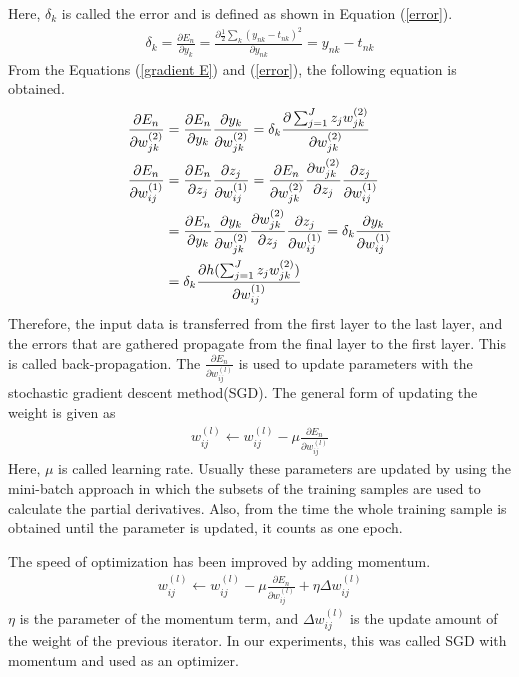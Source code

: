\documentclass[a4paper,12pt]{article}
\begin{document}
Here, $\delta_k$ is called the error and is defined as shown in Equation (\ref{error}).
\begin{align}
\delta_k=\frac{\partial E_n}{\partial y_k}=\frac{\partial \frac{1}{2}\sum_k{(y_{nk}-t_{nk})}^2}{\partial y_{nk}}=y_{nk}-t_{nk}
\end{align}
From the Equations (\ref{gradient E}) and (\ref{error}), the following equation is obtained.
\begin{align} \label{gradient f1}
\frac{\partial E_n}{\partial w^{(2)}_{jk}}
&=\frac{\partial E_n}{\partial y_k}\frac{\partial y_k}{\partial w^{(2)}_{jk}}
=\delta_k \frac{\partial \sum_{j=1}^J{z_j w^{(2)}_{jk}}}{\partial w^{(2)}_{jk}} \\ \notag
\frac{\partial E_n}{\partial w^{(1)}_{ij}}
&=\frac{\partial E_n}{\partial z_j} \frac{\partial z_j}{\partial w^{(1)}_{ij}}
=\frac{\partial E_n}{\partial w^{(2)}_{jk}} \frac{\partial w^{(2)}_{jk}}{\partial z_j} \frac{\partial z_j}{\partial w^{(1)}_{ij}} \\ \notag
&=\frac{\partial E_n}{\partial y_k}\frac{\partial y_k}{\partial w^{(2)}_{jk}} \frac{\partial w^{(2)}_{jk}}{\partial z_j} \frac{\partial z_j}{\partial w^{(1)}_{ij}}
=\delta_k\frac{\partial y_k}{\partial w^{(1)}_{ij}} \\ \label{gradient f2}
&=\delta_k \frac{\partial h(\sum_{j=1}^J{z_j w^{(2)}_{jk}})}{\partial w^{(1)}_{ij}}
\end{align}
Therefore, the input data is transferred from the first layer to the last layer, and the errors that are gathered propagate from the final layer to the first layer. This is called back-propagation.
The $\frac{\partial E_n}{\partial w^{(l)}_{ij}}$ is used to update parameters with the stochastic gradient descent method(SGD). The general form of updating the weight is given as
\begin{align} \label{eq:sgd}
w^{(l)}_{ij} \leftarrow w^{(l)}_{ij}-\mu \frac{\partial E_n}{\partial w^{(l)}_{ij}}
\end{align}
Here, $\mu$ is called learning rate. Usually these parameters are updated by using the mini-batch approach in which the subsets of the training samples are used to calculate the partial derivatives. Also, from the time the whole training sample is obtained until the parameter is updated, it counts as one epoch.

The speed of optimization has been improved by adding momentum.
\begin{align} \label{eq:momentum}
w^{(l)}_{ij} \leftarrow w^{(l)}_{ij}-\mu \frac{\partial E_n}{\partial w^{(l)}_{ij}} + \eta \Delta w^{(l)}_{ij}
\end{align}
$\eta$ is the parameter of the momentum term, and $\Delta w^{(l)}_{ij}$ is the update amount of the weight of the previous iterator.
In our experiments, this was called SGD with momentum and used as an optimizer.
\end{document}
